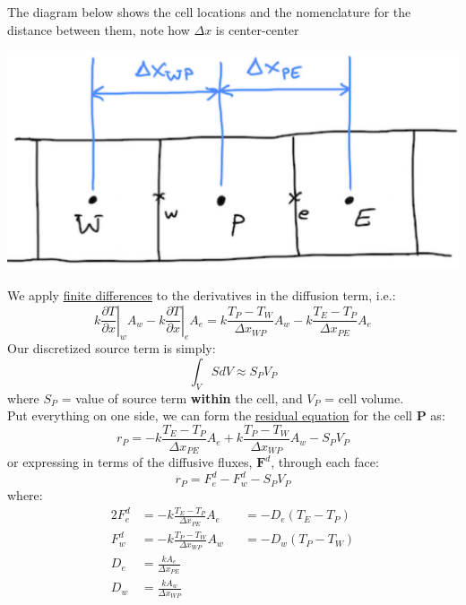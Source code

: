 \documentclass[14pt]{article}
\begin{document}
The diagram below shows the cell locations and the nomenclature for the distance between them, note how \(\Delta x\) is center-center
\begin{center}
\includegraphics[scale=0.2]{pic/heat1D_cell.png}
\end{center}
We apply \uline{finite differences} to the derivatives in the diffusion term, i.e.:
\begin{equation}
k \left .\frac{\partial T}{\partial x}\right|_w A_w - k \left .\frac{\partial T}{\partial x}\right|_e A_e
= k\frac{T_P-T_W}{\Delta x_{WP}}A_w - k\frac{T_E-T_P}{\Delta x_{PE}}A_e
\end{equation}
Our discretized source term is simply:
\begin{equation}
\int_V SdV \approx S_PV_P
\end{equation}
where \(S_P\) = value of source term \textbf{within} the cell, and \(V_P\) = cell volume.\\
Put everything on one side, we can form the \uline{residual equation} for the cell \(\textbf{P}\) as:
\begin{equation}
r_P = - k\frac{T_E-T_P}{\Delta x_{PE}}A_e + k\frac{T_P-T_W}{\Delta x_{WP}}A_w - S_PV_P
\end{equation}
or expressing in terms of the diffusive fluxes, \(\textbf{F}^d\), through each face:
\begin{equation}
r_P = F_{e}^d - F_{w}^d - S_PV_P
\end{equation}
where:\\
\begin{alignat}{2}
F_{e}^d &= - k\frac{T_E-T_P}{\Delta x_{PE}}A_e &&= -D_e(T_E- T_P)\\
F_{w}^d &= - k\frac{T_P-T_W}{\Delta x_{WP}}A_w &&= -D_w(T_P- T_W)\\
D_e &= \frac{kA_e}{\Delta x_{PE}}\\
D_w &= \frac{kA_w}{\Delta x_{WP}}
\end{alignat}
\end{document}
